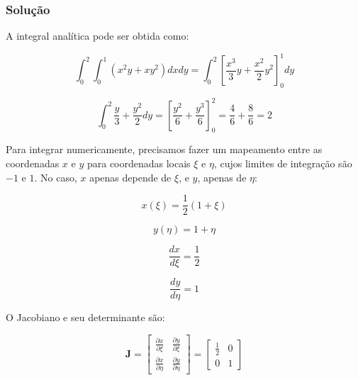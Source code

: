         \subsubsection*{Solução}

        A integral analítica pode ser obtida como:

        \begin{equation*}
            \int_{0}^{2} \int_{0}^{1} (x^2y + xy^2) dx dy = 
            \int_{0}^{2} \left[\frac{x^3}{3}y + \frac{x^2}{2}y^2\right]_0^1 dy
        \end{equation*}

        \begin{equation*}
            \int_{0}^{2} \frac{y}{3} + \frac{y^2}{2} dy = 
            \left[\frac{y^2}{6} + \frac{y^3}{6}\right]_0^2 = \frac{4}{6} + \frac{8}{6} = 2
        \end{equation*}

        Para integrar numericamente, precisamos fazer um mapeamento entre as coordenadas $x$ e $y$ para coordenadas locais $\xi$ e $\eta$, cujos limites de integração são $-1$ e $1$. No caso, $x$ apenas depende de $\xi$, e $y$, apenas de $\eta$:

        \begin{equation*}
            x(\xi) = \frac{1}{2}(1+\xi)
        \end{equation*}

        \begin{equation*}
            y(\eta) = 1+\eta
        \end{equation*}

        \begin{equation*}
            \frac{dx}{d\xi} = \frac{1}{2}
        \end{equation*}

        \begin{equation*}
            \frac{dy}{d\eta} = 1
        \end{equation*}

        O Jacobiano e seu determinante são:

        \begin{equation*}
            \mathbf{J} = 
            \begin{bmatrix}
                 \frac{\partial x}{\partial \xi} &  \frac{\partial y}{\partial \xi}\\
                 \frac{\partial x}{\partial \eta} &  \frac{\partial y}{\partial \eta}
            \end{bmatrix} =
            \begin{bmatrix}
                \frac{1}{2} & 0\\
                0 & 1
            \end{bmatrix}
        \end{equation*}

